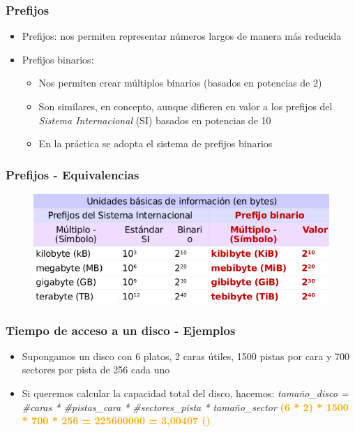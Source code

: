 \begin{frame}
  \frametitle{Prefijos}
  \begin{itemize}
    \item Prefijos: nos permiten representar números largos de manera más reducida
    \item Prefijos binarios: 
    \begin{itemize}
      \item Nos permiten crear múltiplos binarios (basados en potencias de 2)
      \item Son similares, en concepto, aunque difieren en valor a los prefijos del \emph{Sistema Internacional} (SI) basados en potencias de 10
      \item En la práctica se adopta el sistema de prefijos binarios
    \end{itemize}  
  \end{itemize}
\end{frame}

\begin{frame}
  \frametitle{Prefijos - \textbf{Equivalencias}}
  \begin{figure}
      \includegraphics[scale=0.5]{images/si.png}
  \end{figure}
\end{frame}

\begin{frame}
  \frametitle{Tiempo de acceso a un disco - Ejemplos}
  \begin{itemize}
    \item Supongamos un disco con 6 platos, 2 caras útiles, 1500 pistas por cara y 700 sectores por pista de 256 \bytes cada uno
    \item Si queremos calcular la capacidad total del disco, hacemos:
    \linebreak
    \linebreak
    \emph{tamaño\_disco = \#caras * \#pistas\_cara * \#sectores\_pista * tamaño\_sector}
    \linebreak
    \linebreak
    \textcolor{orange}{\textbf{(6 * 2) * 1500 * 700 * 256 \bytes = 225600000 \bytes = 3,00407 \gibishort\bytesshort (\gibi\bytes)}}
  \end{itemize}
\end{frame}

